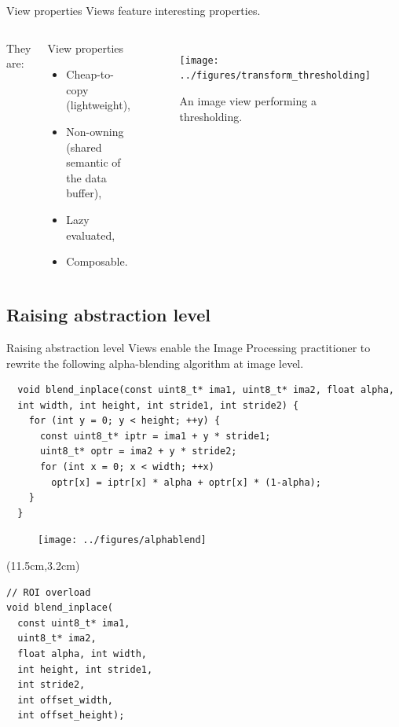 \documentclass[12pt,aspectratio=169]{beamer}
\begin{document}
\begin{frame}[fragile]{View properties}
  Views feature interesting properties.
  \begin{columns}[T,onlytextwidth]
    They are:
    \begin{alertblock}{View properties}
      \begin{itemize}
        \item Cheap-to-copy (lightweight),
        \item Non-owning (shared semantic of the data buffer),
        \item Lazy evaluated,
        \item Composable.
      \end{itemize}
    \end{alertblock}

    \begin{figure}
      \begin{minipage}{\linewidth}
        \texttt{[image: ../figures/transform\_thresholding]}
      \end{minipage}
      \caption{An image view performing a thresholding.}
      \label{fig.view.threshold}
    \end{figure}
  \end{columns}
\end{frame}

\subsection{Raising abstraction level}

\begin{frame}[fragile]{Raising abstraction level}
  Views enable the Image Processing practitioner to rewrite the following alpha-blending algorithm at image level.
  \begin{verbatim}
  void blend_inplace(const uint8_t* ima1, uint8_t* ima2, float alpha,
  int width, int height, int stride1, int stride2) {
    for (int y = 0; y < height; ++y) {
      const uint8_t* iptr = ima1 + y * stride1;
      uint8_t* optr = ima2 + y * stride2;
      for (int x = 0; x < width; ++x)
        optr[x] = iptr[x] * alpha + optr[x] * (1-alpha);
    }
  }
  \end{verbatim}
  \begin{figure}
    \flushleft
    \texttt{[image: ../figures/alphablend]}
  \end{figure}
  \begin{textblock*}{4.5cm}(11.5cm,3.2cm)
    \begin{verbatim}
// ROI overload
void blend_inplace(
  const uint8_t* ima1,
  uint8_t* ima2,
  float alpha, int width,
  int height, int stride1,
  int stride2,
  int offset_width,
  int offset_height);
    \end{verbatim}
  \end{textblock*}
\end{frame}
\end{document}
